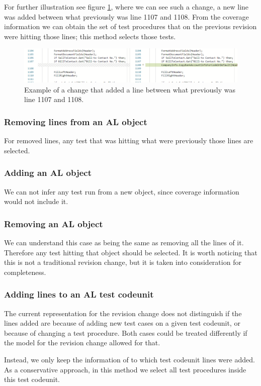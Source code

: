 \documentclass{article}
\begin{document}
For further illustration see figure \ref{fig:addinglinechange}, where we can see such a change, a new line was added between what previously was line 1107 and 1108. From the coverage information we can obtain the set of test procedures that on the previous revision were hitting those lines; this method selects those tests.

\begin{figure}[H]
  \includegraphics[width=\textwidth]{images/addinglinechange.png}
  \caption{Example of a change that added a line between what previously was line 1107 and 1108.}\label{fig:erdiagram}
  \label{fig:addinglinechange}
\end{figure}

\subsubsection{Removing lines from an AL object}
For removed lines, any test that was hitting what were previously those lines are selected.
\subsubsection{Adding an AL object}
We can not infer any test run from a new object, since coverage information would not include it.
\subsubsection{Removing an AL object}
We can understand this case as being the same as removing all the lines of it. Therefore any test hitting that object should be selected. It is worth noticing that this is not a traditional revision change, but it is taken into consideration for completeness.
\subsubsection{Adding lines to an AL test codeunit}
The current representation for the revision change does not distinguish if the lines added are because of adding new test cases on a given test codeunit, or because of changing a test procedure. Both cases could be treated differently if the model for the revision change allowed for that.

Instead, we only keep the information of to which test codeunit lines were added. As a conservative approach, in this method we select all test procedures inside this test codeunit.
\end{document}
